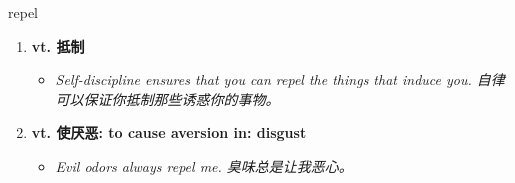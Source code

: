 
\begin{frame}
{\huge repel}
\begin{center}
\begin{enumerate}\Large
  \item \textbf{vt. 抵制}
  \begin{itemize}
    \item \em{\Large{Self-discipline ensures that you can repel the things that induce you. 自律可以保证你抵制那些诱惑你的事物。}}
  \end{itemize}
  \item \textbf{vt. 使厌恶: to cause aversion in: disgust}
  \begin{itemize}
    \item \em{\Large{Evil odors always repel me. 臭味总是让我恶心。}}
  \end{itemize}
\end{enumerate}
\end{center}
\end{frame}
